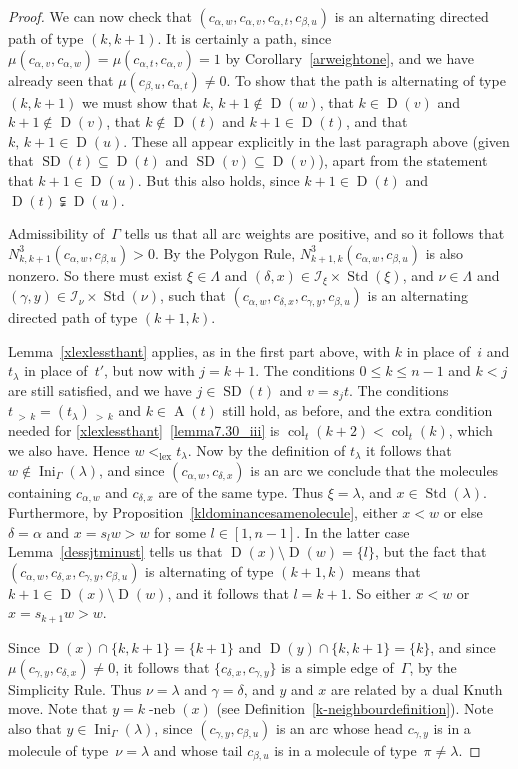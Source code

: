 \documentclass[ALCO,ThmDefs,Unicode,epreuves]{cedram}
\DeclareMathOperator{\Ini}{Ini}
\DeclareMathOperator{\lex}{lex}
\DeclareMathOperator{\col}{col}
\newcommand{\morethan}[2]{#1\,{_{>\,#2}}}
\DeclareMathOperator{\STD}{Std}
\DeclareMathOperator{\neb}{-neb}
\DeclareMathOperator{\SD}{SD}
\DeclareMathOperator{\D}{D}
\DeclareMathOperator{\A}{A}
\begin{document}
\begin{proof}
We can now check that $(c_{\alpha,w},c_{\alpha,v},c_{\alpha,t},c_{\beta,u})$ is
an alternating directed path of type $(k,k+1)$. It is certainly a path, since
$\mu(c_{\alpha,v},c_{\alpha,w})=\mu(c_{\alpha,t},c_{\alpha,v})=1$
by Corollary~\ref{arweightone}, and we have already seen that
$\mu(c_{\beta,u},c_{\alpha,t})\neq 0$. To show that the path is
alternating of type $(k,k+1)$ we must show that $k,\,k+1\notin \D(w)$,
that $k\in\D(v)$ and $k+1\notin\D(v)$, that $k\notin\D(t)$ and
$k+1\in\D(t)$, and that $k,\,k+1\in\D(u)$. These all appear explicitly
in the last paragraph above (given that $\SD(t)\subseteq\D(t)$ and
$\SD(v)\subseteq\D(v)$), apart from the statement that $k+1\in\D(u)$.
But this also holds, since $k+1\in\D(t)$ and $\D(t)\subsetneqq\D(u)$.

Admissibility of~$\Gamma$ tells us that all arc weights are positive,
and so it follows that $N^{3}_{k,k+1}(c_{\alpha,w},c_{\beta,u})>0$.
By the Polygon Rule, $N^{3}_{k+1,k}(c_{\alpha,w},c_{\beta,u})$ is also
nonzero. So there must exist $\xi\in\Lambda$ and
$(\delta,x)\in\mathcal{I}_{\xi}\times\STD(\xi)$, and
$\nu\in\Lambda$ and $(\gamma,y)\in\mathcal{I}_{\nu}\times\STD(\nu)$,
such that $(c_{\alpha,w}, c_{\delta,x}, c_{\gamma,y}, c_{\beta,u})$
is an alternating directed path of type $(k+1,k)$.

Lemma~\ref{xlexlessthant} applies, as in the first part above, with $k$
in place of~$i$ and $t_\lambda$ in place of~$t'$, but now with $j=k+1$.
The conditions $0\leqslant k\leqslant n-1$ and $k<j$ are still satisfied, and
we have $j\in\SD(t)$ and $v=s_jt$. The conditions
$\morethan {\morethan tk=(t_\lambda)}k$ and $k\in\A(t)$ still hold, as
before, and the extra condition needed for \ref{xlexlessthant}~\ref{lemma7.30_iii} is
$\col_t(k+2)<\col_t(k)$, which we also have. Hence $w<_{\lex}t_\lambda$.
Now by the definition of $t_\lambda$ it follows that
$w\notin\Ini_\Gamma(\lambda)$,
and since $(c_{\alpha,w}, c_{\delta,x})$ is an arc we conclude that
the molecules containing $c_{\alpha,w}$ and $c_{\delta,x}$ are of
the same type. Thus $\xi=\lambda$, and $x\in\STD(\lambda)$. Furthermore, by
Proposition~\ref{kldominancesamenolecule}, either $x<w$ or else
$\delta=\alpha$ and $x=s_lw>w$ for some $l\in[1,n-1]$. In the latter
case Lemma~\ref{dessjtminust} tells us that $\D(x)\setminus\D(w)=\{l\}$,
but the fact that $(c_{\alpha,w}, c_{\delta,x}, c_{\gamma,y}, c_{\beta,u})$ is
alternating of type $(k+1,k)$ means that $k+1\in\D(x)\setminus\D(w)$,
and it follows that $l=k+1$. So either $x<w$ or $x=s_{k+1}w>w$.

Since $\D(x)\cap\{k,k+1\}=\{k+1\}$ and $\D(y)\cap\{k,k+1\}=\{k\}$,
and since $\mu(c_{\gamma,y},c_{\delta,x})\neq 0$, it follows that
$\{c_{\delta,x},c_{\gamma,y}\}$ is a simple edge of~$\Gamma$, by
the Simplicity Rule. Thus $\nu=\lambda$ and $\gamma=\delta$, and
$y$ and $x$ are related by a dual Knuth move. Note that $y=k\neb(x)$
(see Definition~\ref{k-neighbourdefinition}). Note also that
$y\in\Ini_\Gamma(\lambda)$,
since $(c_{\gamma,y}, c_{\beta,u})$ is an arc whose head $c_{\gamma,y}$
is in a molecule of type~$\nu=\lambda$ and whose tail $c_{\beta,u}$
is in a molecule of type~$\pi\ne\lambda$.


\end{proof}
\end{document}
